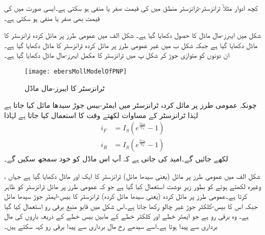 کچھ ادوار مثلاً ٹرانزسٹر-ٹرانزسٹر منطق میں  کی قیمت صفر یا منفی ہو سکتی ہے۔ایسی صورت میں  کی قیمت بھی صفر یا منفی ہو سکتی ہے۔

شکل  میں ایبرز-مال ماڈل کا حصول دکھایا گیا ہے۔ شکل  الف   میں عمومی طرز پر مائل کردہ   ٹرانزسٹر کا ماڈل دکھایا گیا ہے جبکہ شکل  ب میں غیر عمومی طرز پر مائل کردہ ٹرانزسٹر کا ماڈل دکھایا گیا ہے۔ان دونوں کو متوازی جوڑ کر شکل  پ میں  ٹرانزسٹر کا مکمل ایبرز-مال ماڈل دکھایا گیا ہے۔
\begin{figure}
\centering
\texttt{[image: ebersMollModelOfPNP]}
\caption{ ٹرانزسٹر کا ایبرز-مال ماڈل}
\label{شکل_ایبر_مال_ماڈل_جمع_منفی_جمع_ٹرانزسٹر}
\end{figure}
چونکہ عمومی طرز پر مائل کردہ  ٹرانزسٹر میں ایمٹر-بیس   جوڑ سیدھا مائل کیا جاتا ہے لہٰذا   ٹرانزسٹر کے مساوات لکھتے وقت  کا استعمال کیا جاتا ہے لہٰاذا
\begin{align*}
i_F&=I_S \left (e^{\frac{v_{EB}}{V_T}}-1 \right )\\
i_R&=I_S \left (e^{\frac{v_{CB}}{V_T}}-1 \right )
\end{align*}
لکھے جائیں گے۔امید کی جاتی ہے کہ آپ اس ماڈل کو خود سمجھ سکیں گے۔

شکل  الف میں عمومی طرز پر مائل (یعنی سیدھا مائل)   ٹرانزسٹر کا ایک اور ماڈل دکھایا گیا ہے جہاں   ،  وغیرہ لکھتے ہوئے  کو بطور زیرِ نوشت استعمال کیا گیا ہے جو کہ عمومی طرز پر مائل ٹرانزسٹر کو ظاہر کرتا ہے۔عمومی طرز پر مائل کردہ (یعنی سیدھا مائل کردہ) ٹرانزسٹر  کا بیس-ایمٹر جوڑ سیدھا مائل جبکہ اس کا بیس-کلکٹر جوڑ غیر چالو رکھا جاتا ہے۔اس شکل میں قابو منبع برقی رو  استعمال کیا گیا ہے۔ وہ برقی رو ہے جو ایمٹر خطے اور کلکٹر  خطے کے مابین بیس خطے کے ذریعہ باروں کی مال برداری سے پیدا ہوتا ہے۔اسے سیدھے رخ مال برداری سے پیدا برقی رو کہہ سکتے ہیں۔

